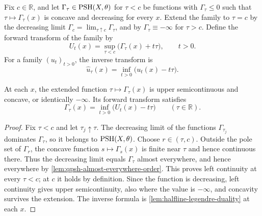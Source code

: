 Fix $c\in\mathbb R$, and let $\Gamma_\tau\in\mathrm{PSH}(X,\theta)$ for $\tau<c$ be functions with $\Gamma_\tau\leq0$ such that $\tau\mapsto\Gamma_\tau(x)$ is concave and decreasing for every $x$. Extend the family to $\tau=c$ by the decreasing limit $\Gamma_c=\lim_{\tau\uparrow c}\Gamma_\tau$, and by $\Gamma_\tau\equiv-\infty$ for $\tau>c$. Define the forward transform of the family by
\begin{equation}\label{eq:hermitian-legendre-forward}
 U_t(x)=\sup_{\tau<c}\bigl(\Gamma_\tau(x)+t\tau\bigr),
 \qquad t>0.
\end{equation}
For a family $(u_t)_{t>0}$, the inverse transform is
\begin{equation}\label{eq:hermitian-legendre-backward}
 \widehat u_\tau(x)=\inf_{t>0}\bigl(u_t(x)-t\tau\bigr).
\end{equation}

\begin{lemma}\label{lem:testcurve-closed-fibers}
At each $x$, the extended function $\tau\mapsto\Gamma_\tau(x)$ is upper semicontinuous and concave, or identically $-\infty$. Its forward transform satisfies
\[
 \Gamma_\tau(x)=\inf_{t>0}\bigl(U_t(x)-t\tau\bigr)
 \qquad(\tau\in\mathbb R).
\]
\end{lemma}
\begin{proof}
Fix $\tau<c$ and let $\tau_j\uparrow\tau$. The decreasing limit of the functions $\Gamma_{\tau_j}$ dominates $\Gamma_\tau$, so it belongs to $\mathrm{PSH}(X,\theta)$. Choose $r\in(\tau,c)$. Outside the pole set of $\Gamma_r$, the concave function $s\mapsto\Gamma_s(x)$ is finite near $\tau$ and hence continuous there. Thus the decreasing limit equals $\Gamma_\tau$ almost everywhere, and hence everywhere by \cref{lem:qpsh-almost-everywhere-order}. This proves left continuity at every $\tau<c$; at $c$ it holds by definition. Since the function is decreasing, left continuity gives upper semicontinuity, also where the value is $-\infty$, and concavity survives the extension. The inverse formula is \cref{lem:halfline-legendre-duality} at each $x$.
\end{proof}

